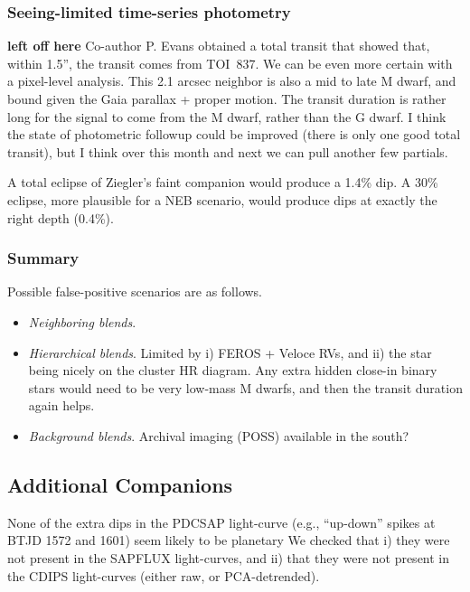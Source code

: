 \documentclass[12pt,twocolumn,tighten]{aastex62}
\newcommand{\tn}{TOI~837} %
\begin{document}
\subsubsection{Seeing-limited time-series photometry}

{\bf left off here}
Co-author P{.} Evans obtained a total transit that showed that, within
1.5'', the transit comes from \tn.  We can be even more certain with a
pixel-level analysis. This 2.1 arcsec neighbor is also a mid to late M
dwarf, and bound given the Gaia parallax + proper motion. The transit
duration is rather long for the signal to come from the M dwarf,
rather than the G dwarf.  I think the state of photometric followup
could be improved (there is only one good total transit), but I think
over this month and next we can pull another few partials.

A total eclipse of Ziegler's faint companion would produce a 1.4\%
dip. A 30\% eclipse, more plausible for a NEB scenario, would produce
dips at exactly the right depth (0.4\%).

\subsubsection{Summary}

Possible false-positive scenarios are as follows.

\begin{itemize}
  \item {\it Neighboring blends}.

  \item {\it Hierarchical blends}.
    Limited by i) FEROS + Veloce RVs, and ii) the star being nicely on the
    cluster HR diagram. Any extra hidden close-in binary stars would
    need to be very low-mass M dwarfs, and then the transit duration
    again helps.

  \item {\it Background blends}.
  Archival imaging (POSS) available in the south?
\end{itemize}


\subsection{Additional Companions}

None of the extra dips in the PDCSAP light-curve (e.g., ``up-down''
spikes at BTJD 1572 and 1601) seem likely to be planetary
We checked that i) they were not present in the SAPFLUX light-curves,
and ii) that they were not present in the CDIPS light-curves (either
raw, or PCA-detrended).
\end{document}
